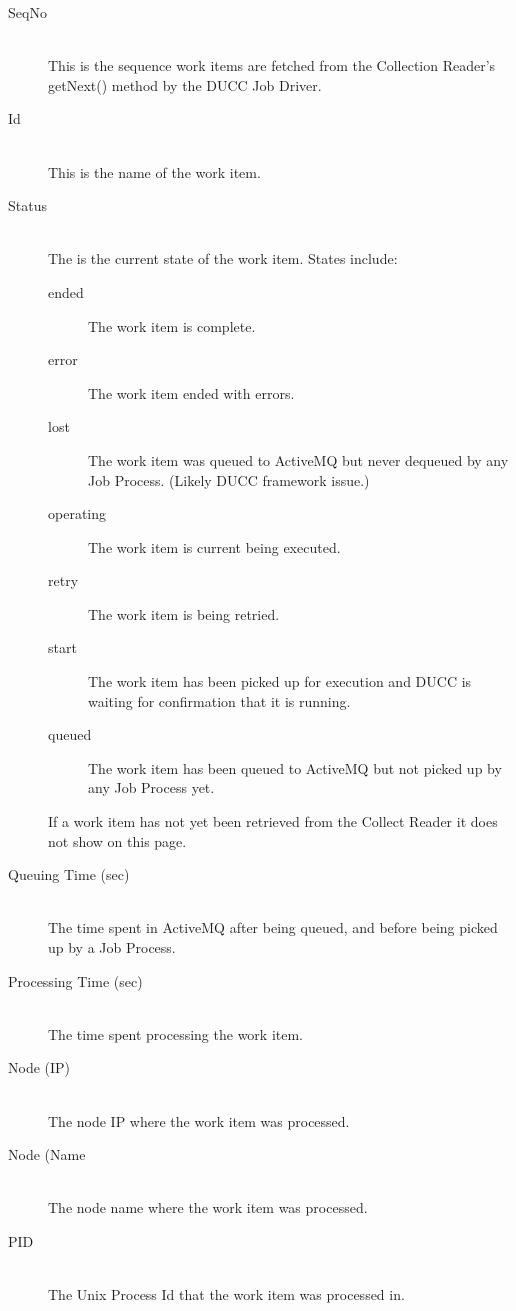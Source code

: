    \begin{description}
     \item[SeqNo]  \hfill \\
       This is the sequence work items are fetched from the Collection Reader's
       getNext() method by the DUCC Job Driver.
     \item[Id]  \hfill \\
       This is the name of the work item.
     \item[Status]  \hfill \\
       The is the current state of the work item.  
       States include:
       \begin{description}
         \item[ended] The work item is complete.
         \item[error] The work item ended with errors.
         \item[lost] The work item was queued to ActiveMQ but never dequeued by
         any Job Process. (Likely DUCC framework issue.)
         \item[operating] The work item is current being executed.
         \item[retry] The work item is being retried.
         \item[start] The work item has been picked up for execution and DUCC is waiting
           for confirmation that it is running.
         \item[queued] The work item has been queued to ActiveMQ but not picked up by any
           Job Process yet.
       \end{description}
       If a work item has not yet been retrieved from the Collect Reader it does not show
       on this page.
     \item[Queuing Time (sec)]  \hfill \\
       The time spent in ActiveMQ after being queued, and before
       being picked up by a Job Process.
     \item[Processing Time (sec)]  \hfill \\
       The time spent processing the work item.
     \item[Node (IP)]  \hfill \\
       The node IP where the work item was processed.
     \item[Node (Name]  \hfill \\
       The node name where the work item was processed.
     \item[PID]  \hfill \\
       The Unix Process Id that the work item was processed in.
   \end{description}
   

